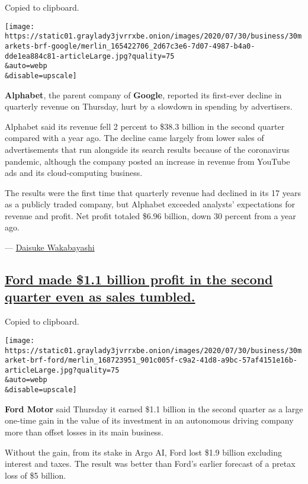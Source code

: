 Copied to clipboard.

\texttt{[image: https://static01.graylady3jvrrxbe.onion/images/2020/07/30/business/30markets-brf-google/merlin\_165422706\_2d67c3e6-7d07-4987-b4a0-dde1ea884c81-articleLarge.jpg?quality=75\\\&auto=webp\\\&disable=upscale]}

\textbf{Alphabet}, the parent company of \textbf{Google}, reported its
first-ever decline in quarterly revenue on Thursday, hurt by a slowdown
in spending by advertisers.

Alphabet said its revenue fell 2 percent to \$38.3 billion in the second
quarter compared with a year ago. The decline came largely from lower
sales of advertisements that run alongside its search results because of
the coronavirus pandemic, although the company posted an increase in
revenue from YouTube ads and its cloud-computing business.

The results were the first time that quarterly revenue had declined in
its 17 years as a publicly traded company, but Alphabet exceeded
analysts' expectations for revenue and profit. Net profit totaled \$6.96
billion, down 30 percent from a year ago.

---
\href{https://www.nytimes3xbfgragh.onion/by/daisuke-wakabayashi}{Daisuke
Wakabayashi}

\hypertarget{ford-made-11-billion-profit-in-the-second-quarter-even-as-sales-tumbled}{%
\subsection{\texorpdfstring{\protect\hyperlink{ford-made-1-1-billion-profit-in-the-second-quarter-even-as-sales-tumbled}{Ford
made \$1.1 billion profit in the second quarter even as sales
tumbled.}}{Ford made \$1.1 billion profit in the second quarter even as sales tumbled.}}\label{ford-made-11-billion-profit-in-the-second-quarter-even-as-sales-tumbled}}

Copied to clipboard.

\texttt{[image: https://static01.graylady3jvrrxbe.onion/images/2020/07/30/business/30market-brf-ford/merlin\_168723951\_901c005f-c9a2-41d8-a9bc-57af4151e16b-articleLarge.jpg?quality=75\\\&auto=webp\\\&disable=upscale]}

\textbf{Ford Motor} said Thursday it earned \$1.1 billion in the second
quarter as a large one-time gain in the value of its investment in an
autonomous driving company more than offset losses in its main business.

Without the gain, from its stake in Argo AI, Ford lost \$1.9 billion
excluding interest and taxes. The result was better than Ford's earlier
forecast of a pretax loss of \$5 billion.


